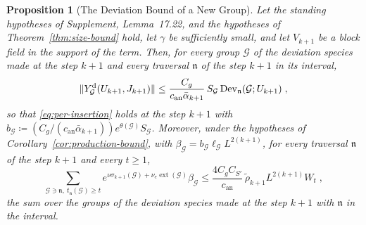 \documentclass[11pt]{preprint}
\DeclarePairedDelimiter{\norm}{\lVert}{\rVert}
\numberwithin{equation}{section}
\newtheorem{proposition}[theorem]{Proposition}
\theoremstyle{definition}
\theoremstyle{remark}
\theoremstyle{plain}
\begin{document}
\begin{proposition}[The Deviation Bound of a New Group]\label{prop:new-deviation}
Let the standing hypotheses of Supplement, Lemma~17.22, and the hypotheses of Theorem~\ref{thm:size-bound} hold, let $\gamma$ be sufficiently small, and let $V_{k+1}$ be a block field in the support of the term. Then, for every group $\mathcal G$ of the deviation species made at the step $k + 1$ and every traversal $\mathfrak n$ of the step $k + 1$ in its interval,
\begin{equation}\label{eq:new-per-insertion}
    \norm{Y^{\mathrm d}_{\mathcal G}(U_{k+1}, J_{k+1})} \leq \frac{C_g}{c_{\mathrm{an}}\bar\alpha_{k+1}}\,S_{\mathcal G}\operatorname{Dev}_{\mathfrak n}(\mathcal G; U_{k+1})\;,
\end{equation}
so that \eqref{eq:per-insertion} holds at the step $k + 1$ with $b_{\mathcal G} \coloneqq (C_g/(c_{\mathrm{an}}\bar\alpha_{k+1}))e^{\theta(\mathcal G)}S_{\mathcal G}$. Moreover, under the hypotheses of Corollary~\ref{cor:production-bound}, with $\beta_{\mathcal G} = b_{\mathcal G}\ell_{\mathcal G}L^{2(k+1)}$, for every traversal $\mathfrak n$ of the step $k + 1$ and every $t \geq 1$,
\begin{equation}\label{eq:new-tail}
    \sum_{\mathcal G \ni \mathfrak n,\ t_{\mathfrak n}(\mathcal G) \geq t}e^{\nu\sigma_{k+1}(\mathcal G) + \nu_e\operatorname{ext}(\mathcal G)}\beta_{\mathcal G} \leq \frac{4C_gC_{S'}}{c_{\mathrm{an}}}\,\tilde\rho_{k+1}L^{2(k+1)}W_t\;,
\end{equation}
the sum over the groups of the deviation species made at the step $k + 1$ with $\mathfrak n$ in the interval.
\end{proposition}
\end{document}
